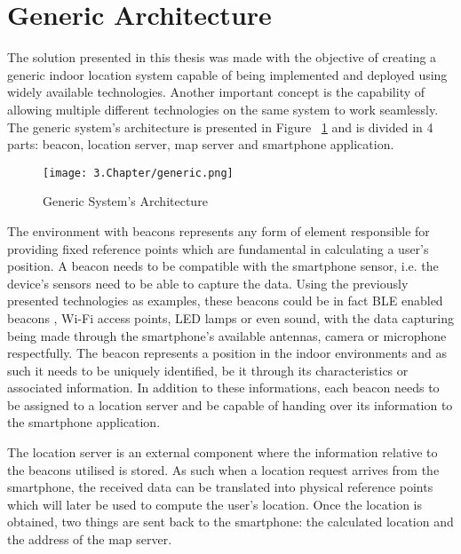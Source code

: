 \section{Generic Architecture} 
\label{sec:generic} 
 
 
The solution presented in this thesis was made with the objective of creating a generic indoor location system capable of being implemented and deployed using widely available technologies. Another important concept is the capability of allowing multiple different technologies on the same system to work seamlessly. The generic system's architecture is presented in Figure ~\ref{fig:generic} and is divided in 4 parts: beacon, location server, map server and smartphone application.  
 
 
 
 
\begin{figure}[H] 
\centering 
\texttt{[image: 3.Chapter/generic.png]} 
\caption[Generic System's Architecture]{Generic System's Architecture} 
\label{fig:generic} 
\end{figure} 
 
 
The environment with beacons represents any form of element responsible for providing fixed reference points which are fundamental in calculating a user's position. A beacon needs to be compatible with the smartphone sensor, i.e. the device's sensors need to be able to capture the data. Using the previously presented technologies as examples, these beacons could be in fact BLE enabled beacons , Wi-Fi access points, LED lamps or even sound, with the data capturing being made through the smartphone's available antennas, camera or microphone respectfully. The beacon represents a position in the indoor environments and as such it needs to be uniquely identified, be it through its characteristics or associated information. In addition to these informations, each beacon needs to be assigned to a location server and be capable of handing over its information to the smartphone application.  
 
 
 
 
The location server is an external component where the information relative to the beacons utilised is stored. As such when a location request arrives from the smartphone, the received data can be translated into physical reference points which will later be used to compute the user's location. Once the location is obtained, two things are sent back to the smartphone: the calculated location and the address of the map server. 
 
